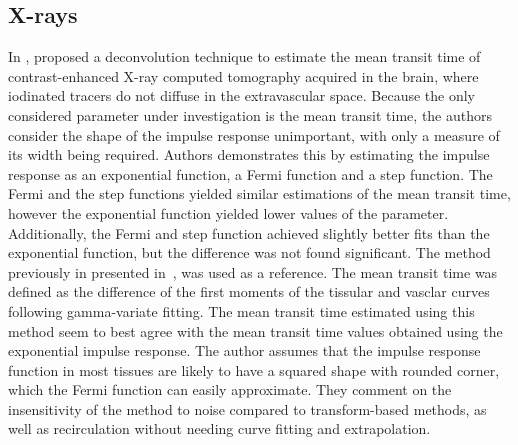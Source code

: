 \subsection{X-rays}
In \citeyear{Axel:1982wu}, \citet{Axel:1982wu} proposed a deconvolution technique to estimate the mean transit time of contrast-enhanced X-ray computed tomography acquired in the brain, where iodinated tracers do not diffuse in the extravascular space. 
Because the only considered parameter under investigation is the mean transit time, the authors consider the shape of the impulse response unimportant, with only a measure of its width being required.
Authors demonstrates this by estimating the impulse response as an exponential function, a Fermi function and a step function. 
The Fermi and the step functions yielded similar estimations of the mean transit time, however the exponential function yielded lower values of the parameter.
Additionally, the Fermi and step function achieved slightly better fits than the exponential function, but the difference was not found significant.
The method previously in presented in~\cite{Axel:1980jg}, was used as a reference. 
The mean transit time was defined as the difference of the first moments of the tissular and vasclar curves following gamma-variate fitting.
The mean transit time estimated using this method seem to best agree with the mean transit time values obtained using the exponential impulse response.
The author assumes that the impulse response function in most tissues are likely to have a squared shape with rounded corner, which the Fermi function can easily approximate.
They comment on the insensitivity of the method to noise compared to transform-based methods, as well as recirculation without needing curve fitting and extrapolation.

